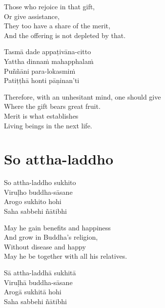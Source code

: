 \begin{english-verses}
  Those who rejoice in that gift,\\
  Or give assistance,\\
  They too have a share of the merit,\\
  And the offering is not depleted by that.
\end{english-verses}

\begin{pali-hang-continued}
  Tasmā dade appaṭivāna-citto\\
  Yattha dinnaṁ mahapphalaṁ\\
  Puññāni para-lokasmiṁ\\
  Patiṭṭhā honti pāṇinan'ti
\end{pali-hang-continued}

\begin{english-verses}
  Therefore, with an unhesitant mind, one should give\\
  Where the gift bears great fruit.\\
  Merit is what establishes\\
  Living beings in the next life.
\end{english-verses}

\suttaRef{[AN 5.36]}

\section{So attha-laddho}
\label{so-attha-laddho}

\vspace{-0.6em}

\begin{verses}
  So attha-laddho sukhito\\
  Viruḷho buddha-sāsane\\
  Arogo sukhito hohi\\
  Saha sabbehi ñātibhi
\end{verses}

\begin{english-verses}
  May he gain benefits and happiness\\
  And grow in Buddha's religion,\\
  Without disease and happy\\
  May he be together with all his relatives.
\end{english-verses}

\begin{pali-hang-continued}
  Sā attha-laddhā sukhitā\\
  Viruḷhā buddha-sāsane\\
  Arogā sukhitā hohi\\
  Saha sabbehi ñātibhi
\end{pali-hang-continued}


